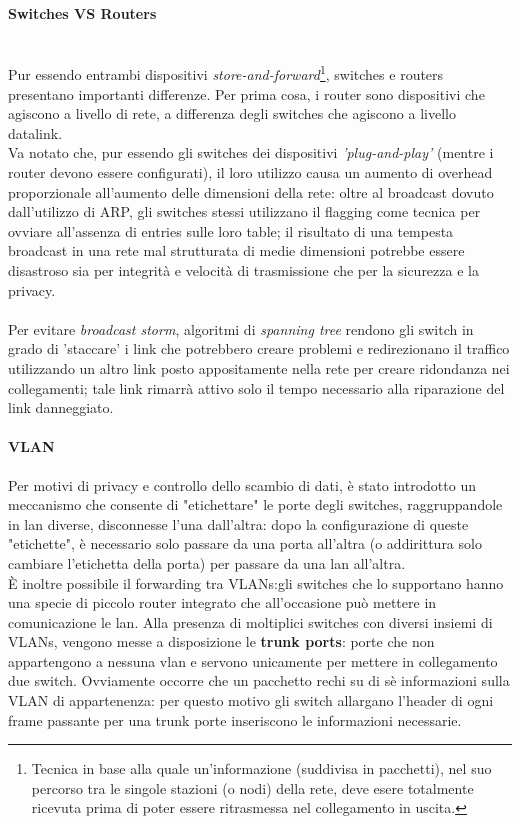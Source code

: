 \paragraph{Switches VS Routers}\hfil\\
Pur essendo entrambi dispositivi \textit{store-and-forward}\footnote{Tecnica in base alla quale un'informazione (suddivisa in pacchetti), nel suo percorso tra le singole stazioni (o nodi) della rete, deve esere totalmente ricevuta prima di poter essere ritrasmessa nel collegamento in uscita.}, switches e routers presentano importanti differenze. Per prima cosa, i router sono dispositivi che agiscono a livello di rete, a differenza degli switches che agiscono a livello datalink.\\
Va notato che, pur essendo gli switches dei dispositivi \textit{'plug-and-play'} (mentre i router devono essere configurati), il loro utilizzo causa un aumento di overhead proporzionale all'aumento delle dimensioni della rete: oltre al broadcast dovuto dall'utilizzo di ARP, gli switches stessi utilizzano il flagging come tecnica per ovviare all'assenza di entries sulle loro table; il risultato di una tempesta broadcast in una rete mal strutturata di medie dimensioni potrebbe essere disastroso sia per integrità e velocità di trasmissione che per la sicurezza e la privacy.\\\\
Per evitare \textit{broadcast storm}, algoritmi di \textit{spanning tree} rendono gli switch in grado di 'staccare' i link che potrebbero creare problemi e redirezionano il traffico utilizzando un altro link posto appositamente nella rete per creare ridondanza nei collegamenti; tale link rimarrà attivo solo il tempo necessario alla riparazione del link danneggiato.
\paragraph{VLAN}
Per motivi di privacy e controllo dello scambio di dati, è stato introdotto un meccanismo che consente di "etichettare" le porte degli switches, raggruppandole in lan diverse, disconnesse l'una dall'altra: dopo la configurazione di queste "etichette", è necessario solo passare da una porta all'altra (o addirittura solo cambiare l'etichetta della porta) per passare da una lan all'altra.\\
È inoltre possibile il forwarding tra VLANs:gli switches che lo supportano hanno una specie di piccolo router integrato che all'occasione può mettere in comunicazione le lan. Alla presenza di moltiplici switches con diversi insiemi di VLANs, vengono messe a disposizione le \textbf{trunk ports}: porte che non appartengono a nessuna vlan e servono unicamente per mettere in collegamento due switch. Ovviamente occorre che un pacchetto rechi su di sè informazioni sulla VLAN di appartenenza: per questo motivo gli switch allargano l'header di ogni frame passante per una trunk porte inseriscono le informazioni necessarie.\\
\newpage
